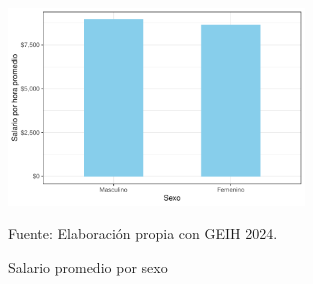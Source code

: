         \begin{figure}[H]
            \caption{Salario promedio por sexo}
            \centering
            \includegraphics[width=0.7\textwidth]{imagenes/barras1.pdf}
             \label{fig:barras_sex}
            \begin{minipage}{7\textwidth}
            \footnotesize
            \hspace{4cm} Fuente: Elaboración propia con GEIH 2024.
       
            \end{minipage}
        \end{figure}